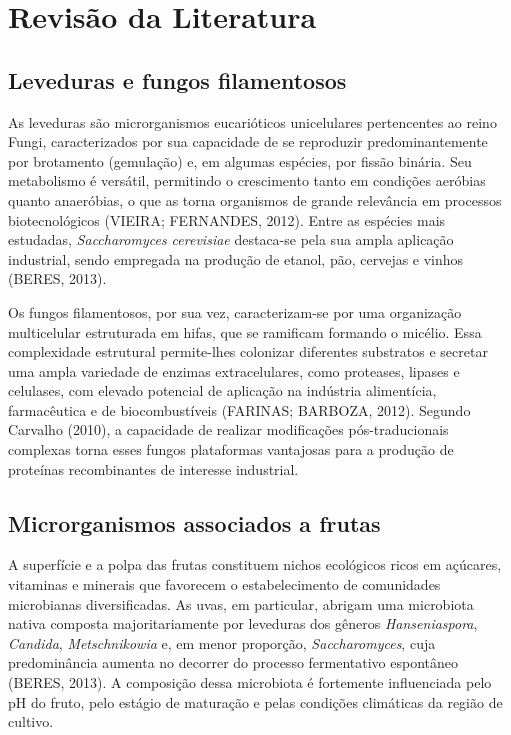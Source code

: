 
\section{Revisão da Literatura}

\subsection{Leveduras e fungos filamentosos}

As leveduras são microrganismos eucarióticos unicelulares pertencentes ao reino Fungi, caracterizados por sua capacidade de se reproduzir predominantemente por brotamento (gemulação) e, em algumas espécies, por fissão binária. Seu metabolismo é versátil, permitindo o crescimento tanto em condições aeróbias quanto anaeróbias, o que as torna organismos de grande relevância em processos biotecnológicos (VIEIRA; FERNANDES, 2012). Entre as espécies mais estudadas, \textit{Saccharomyces cerevisiae} destaca-se pela sua ampla aplicação industrial, sendo empregada na produção de etanol, pão, cervejas e vinhos (BERES, 2013).

Os fungos filamentosos, por sua vez, caracterizam-se por uma organização multicelular estruturada em hifas, que se ramificam formando o micélio. Essa complexidade estrutural permite-lhes colonizar diferentes substratos e secretar uma ampla variedade de enzimas extracelulares, como proteases, lipases e celulases, com elevado potencial de aplicação na indústria alimentícia, farmacêutica e de biocombustíveis (FARINAS; BARBOZA, 2012). Segundo Carvalho (2010), a capacidade de realizar modificações pós-traducionais complexas torna esses fungos plataformas vantajosas para a produção de proteínas recombinantes de interesse industrial.

\subsection{Microrganismos associados a frutas}

A superfície e a polpa das frutas constituem nichos ecológicos ricos em açúcares, vitaminas e minerais que favorecem o estabelecimento de comunidades microbianas diversificadas. As uvas, em particular, abrigam uma microbiota nativa composta majoritariamente por leveduras dos gêneros \textit{Hanseniaspora}, \textit{Candida}, \textit{Metschnikowia} e, em menor proporção, \textit{Saccharomyces}, cuja predominância aumenta no decorrer do processo fermentativo espontâneo (BERES, 2013). A composição dessa microbiota é fortemente influenciada pelo pH do fruto, pelo estágio de maturação e pelas condições climáticas da região de cultivo.

